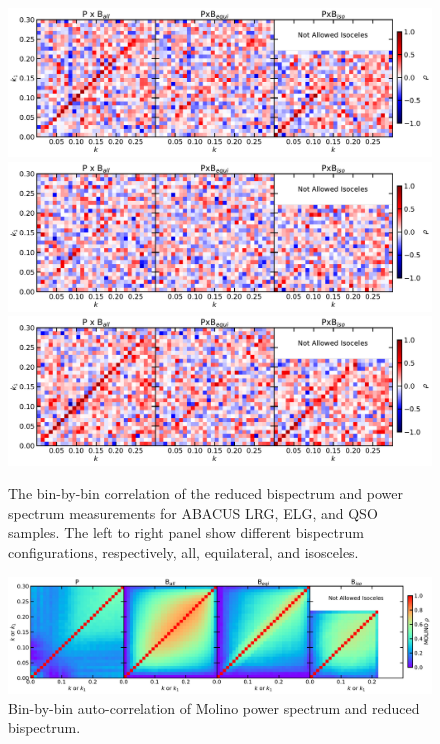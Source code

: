 \begin{figure}
    \centering
    \includegraphics[width=\textwidth]{figures/corrmax_lrg.pdf}
    \includegraphics[width=\textwidth]{figures/corrmax_elg.pdf}
    \includegraphics[width=\textwidth]{figures/corrmax_qso.pdf}
    \caption{The bin-by-bin correlation of the reduced bispectrum and power spectrum measurements for ABACUS LRG, ELG, and QSO samples. The left to right panel show different bispectrum configurations, respectively, all, equilateral, and isosceles.}
    \label{fig:correlation}
\end{figure}


\begin{figure}
    \centering
    \includegraphics[width=\textwidth]{figures/corrmax_molino.pdf}
    \caption{Bin-by-bin auto-correlation of Molino power spectrum and reduced bispectrum.}
    \label{fig:correlation_molino}
\end{figure}





